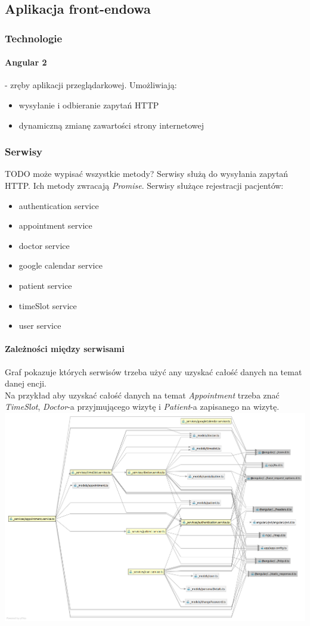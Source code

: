 \documentclass[polish,12pt]{aghthesis}
\begin{document}
\subsection{Aplikacja front-endowa}
\subsubsection{Technologie}
\paragraph{Angular 2} - zręby aplikacji przeglądarkowej. Umożliwiają:
\begin{itemize}
    \item wysyłanie i odbieranie zapytań HTTP
    \item dynamiczną zmianę zawartości strony internetowej
\end{itemize}
\subsubsection{Serwisy}
TODO może wypisać wszystkie metody?
Serwisy służą do wysyłania zapytań HTTP. Ich metody zwracają \emph{Promise}. Serwisy służące rejestracji pacjentów:
\begin{itemize}
    \item authentication service
    \item appointment service
    \item doctor service
    \item google calendar service
    \item patient service
    \item timeSlot service
    \item user service
\end{itemize}
\paragraph{Zależności między serwisami}{
 Graf pokazuje których serwisów trzeba użyć any uzyskać całość danych na temat danej encji. \\
 Na przykład aby uzyskać całość danych na temat \emph{Appointment} trzeba znać \emph{TimeSlot}, \emph{Doctor}-a przyjmującego wizytę i \emph{Patient}-a zapisanego na wizytę.
 \includegraphics[width=\textwidth]{services-dep}
}
\end{document}

